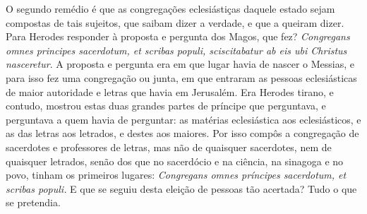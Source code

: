 O segundo remédio é que as congregações eclesiástiças daquele estado
sejam compostas de tais sujeitos, que saibam dizer a verdade, e que a
queiram dizer. Para Herodes responder à proposta e pergunta dos Magos,
que fez? \emph{Congregans omnes principes sacerdotum, et scribas populi,
sciscitabatur ab eis ubi Christus nasceretur}. A proposta e
pergunta era em que lugar havia de nascer o Messias, e para isso fez uma
congregação ou junta, em que entraram as pessoas eclesiásticas de maior
autoridade e letras que havia em Jerusalém. Era Herodes tirano, e
contudo, mostrou estas duas grandes partes de príncipe que perguntava, e
perguntava a quem havia de perguntar: as matérias eclesiástica aos
eclesiásticos, e as das letras aos letrados, e destes aos maiores. Por
isso compôs a congregação de sacerdotes e professores de letras, mas não
de quaisquer sacerdotes, nem de quaisquer letrados, senão dos que no
sacerdócio e na ciência, na sinagoga e no povo, tinham os primeiros
lugares: \emph{Congregans omnes príncipes sacerdotum, et scribas
populi.} E que se seguiu desta eleição de pessoas tão acertada? Tudo o
que se pretendia.

